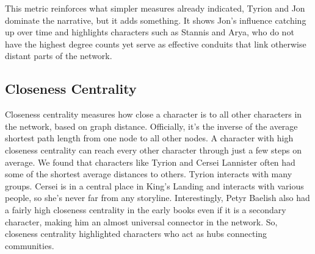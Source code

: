 \documentclass[12pt, a4paper]{article}
\begin{document}
This metric  reinforces what simpler measures already indicated, 
Tyrion and Jon dominate the narrative, but it adds something. 
It shows Jon's influence catching up over time and highlights 
characters such as Stannis and Arya, who do not have the 
highest degree counts yet serve as effective conduits that
 link otherwise distant parts of the network.


\subsection*{Closeness Centrality}
Closeness centrality measures how close a character is to all 
other characters in the network, based on graph distance. 
Officially, it's the inverse of the average shortest path length 
from one node to all other nodes. A character with high closeness 
centrality can reach every other character through just a few steps 
on average. 
We found that characters like Tyrion and 
 Cersei Lannister often had some of the shortest average 
 distances to others. Tyrion interacts with 
 many groups. Cersei is in a central place in King's Landing 
 and interacts with various people, so she's never far from any storyline. 
 Interestingly, Petyr Baelish also had a 
 fairly high closeness centrality in the early books even if it is a secondary character,
  making him an almost universal 
 connector in the network. So, closeness centrality 
 highlighted characters who act as hubs connecting 
 communities.
\end{document}
